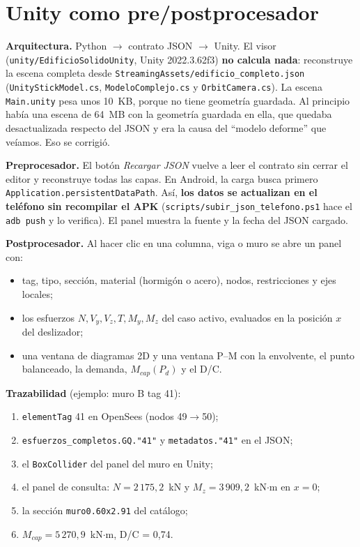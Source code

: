 \documentclass[11pt,a4paper]{article}
\begin{document}
\section{Unity como pre/postprocesador}

\textbf{Arquitectura.} Python $\to$ contrato JSON $\to$ Unity. El visor
(\texttt{unity/EdificioSolidoUnity}, Unity 2022.3.62f3) \textbf{no calcula
nada}: reconstruye la escena completa desde
\texttt{StreamingAssets/edificio\_completo.json} (\texttt{UnityStickModel.cs},
\texttt{ModeloComplejo.cs} y \texttt{OrbitCamera.cs}). La escena
\texttt{Main.unity} pesa unos 10~KB, porque no tiene geometría guardada. Al
principio había una escena de 64~MB con la geometría guardada en ella, que
quedaba desactualizada respecto del JSON y era la causa del ``modelo deforme''
que veíamos. Eso se corrigió.

\textbf{Preprocesador.} El botón \emph{Recargar JSON} vuelve a leer el contrato
sin cerrar el editor y reconstruye todas las capas. En Android, la carga busca
primero \texttt{Application.persistentDataPath}. Así, \textbf{los datos se
actualizan en el teléfono sin recompilar el APK}
(\texttt{scripts/subir\_json\_telefono.ps1} hace el \texttt{adb push} y lo
verifica). El panel muestra la fuente y la fecha del JSON cargado.

\textbf{Postprocesador.} Al hacer clic en una columna, viga o muro se abre un
panel con:
\begin{itemize}
  \item tag, tipo, sección, material (hormigón o acero), nodos, restricciones y
        ejes locales;
  \item los esfuerzos $N, V_y, V_z, T, M_y, M_z$ del caso activo, evaluados en
        la posición $x$ del deslizador;
  \item una ventana de diagramas 2D y una ventana P--M con la envolvente, el
        punto balanceado, la demanda, $M_{cap}(P_d)$ y el D/C.
\end{itemize}

\textbf{Trazabilidad} (ejemplo: muro B tag 41):
\begin{enumerate}
  \item \texttt{elementTag} 41 en OpenSees (nodos 49$\to$50);
  \item \texttt{esfuerzos\_completos.GQ."41"} y \texttt{metadatos."41"} en el JSON;
  \item el \texttt{BoxCollider} del panel del muro en Unity;
  \item el panel de consulta: $N = 2\,175{,}2$~kN y
        $M_z = 3\,909{,}2$~kN$\cdot$m en $x = 0$;
  \item la sección \texttt{muro0.60x2.91} del catálogo;
  \item $M_{cap} = 5\,270{,}9$~kN$\cdot$m, D/C = 0,74.
\end{enumerate}
\end{document}
